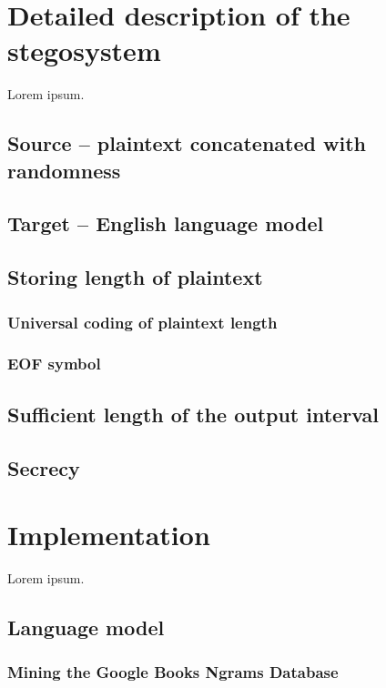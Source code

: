 \documentclass{IIBproject}
\begin{document}
\newpage
\section{Detailed description of the stegosystem}

Lorem ipsum.

\subsection{Source -- plaintext concatenated with randomness}

\subsection{Target -- English language model}

\subsection{Storing length of plaintext}

\subsubsection{Universal coding of plaintext length}

\subsubsection{EOF symbol}

\subsection{Sufficient length of the output interval}

\subsection{Secrecy}

\newpage
\section{Implementation}

Lorem ipsum.

\subsection{Language model}

\subsubsection{Mining the Google Books Ngrams Database}
\end{document}
